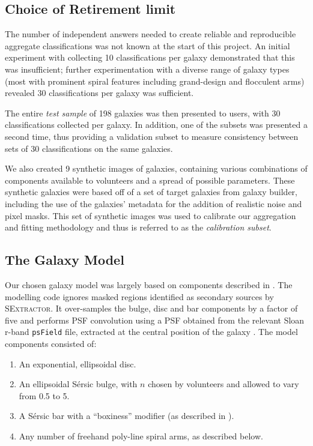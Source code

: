 \documentclass[../main.tex]{subfiles}
\begin{document}
\subsection{Choice of Retirement limit}
\label{sec:retirement-limit}

The number of independent answers needed to create reliable and reproducible aggregate classifications was not known at the start of this project. An initial experiment with collecting 10 classifications per galaxy demonstrated that this was insufficient; further experimentation with a diverse range of galaxy types (most with prominent spiral features including grand-design and flocculent arms) revealed 30 classifications per galaxy was sufficient.

The entire {\it test sample} of 198 galaxies was then presented to users, with 30 classifications collected per galaxy. In addition, one of the subsets was presented a second time, thus providing a validation subset to measure consistency between sets of 30 classifications on the same galaxies.

We also created 9 synthetic images of galaxies, containing various combinations of components available to volunteers and a spread of possible parameters. These synthetic galaxies were based off of a set of target galaxies from galaxy builder, including the use of the galaxies' metadata for the addition of realistic noise and pixel masks. This set of synthetic images was used to calibrate our aggregation and fitting methodology and thus is referred to as the \textit{calibration subset}.

\subsection{The Galaxy Model}
\label{section:galaxy-model}

Our chosen galaxy model was largely based on components described in \citet{galfit-paper}. The modelling code ignores masked regions identified as secondary sources by \textsc{SExtractor}. It over-samples the bulge, disc and bar components by a factor of five and performs PSF convolution using a PSF obtained from the relevant Sloan r-band \texttt{psField} file, extracted at the central position of the galaxy \citep{2002AJ....123..485S}. The model components consisted of:

\begin{enumerate}
\item An exponential, ellipsoidal disc.
\item An ellipsoidal S\'ersic bulge, with $n$ chosen by volunteers and allowed to vary from 0.5 to 5.
\item A S\'ersic bar with a ``boxiness'' modifier (as described in \citealt{galfit-paper}).
\item Any number of freehand poly-line spiral arms, as described below.
\end{enumerate}
\end{document}
